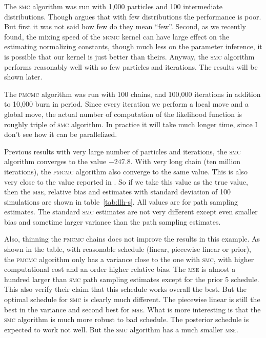 \documentclass[11pt, bib, fontset = Minion]{marticle}
\def\mcmc{\textsc{mcmc}\xspace}
\def\mse{\textsc{mse}\xspace}
\def\pmcmc{\textsc{pmcmc}\xspace}
\def\smc{\textsc{smc}\xspace}
\begin{document}
  The \smc algorithm was run with 1,000 particles and 100 intermediate
  distributions. Though \textcite{DelMoral:2006hc} argues that with few
  distributions the performance is poor. But first it was not said how few do
  they mean ``few''. Second, as we recently found, the mixing speed of the
  \mcmc kernel can have large effect on the estimating normalizing constants,
  though much less on the parameter inference, it is possible that our kernel
  is just better than theirs. Anyway, the \smc algorithm performs reasonably
  well with so few particles and iterations. The results will be shown later.

  The \pmcmc algorithm was run with 100 chains, and 100,000 iterations in
  addition to 10,000 burn in period. Since every iteration we perform a local
  move and a global move, the actual number of computation of the likelihood
  function is roughly triple of \smc algorithm. In practice it will take much
  longer time, since I don't see how it can be parallelized.

  Previous results with very large number of particles and iterations, the
  \smc algorithm converges to the value $-247.8$. With very long chain (ten
  million iterations), the \pmcmc algorithm also converge to the same value.
  This is also very close to the value reported in \textcite{DelMoral:2006hc}.
  So if we take this value as the true value, then the \mse, relative bias and
  estimates with standard deviation of 100 simulations are shown in
  table~\ref{tab:llh-s}. All values are for path sampling estimates. The
  standard \smc estimates are not very different except even smaller bias and
  sometime larger variance than the path sampling estimates.

  Also, thinning the \pmcmc chains does not improve the results in this
  example. As shown in the table, with reasonable schedule (linear, piecewise
  linear or prior), the \pmcmc algorithm only has a variance close to the one
  with \smc, with higher computational cost and an order higher relative bias.
  The \mse is almost a hundred larger than \smc path sampling estimates except
  for the prior 5 schedule. This also verify their claim that this schedule
  works overall the best. But the optimal schedule for \smc is clearly much
  different. The piecewise linear is still the best in the variance and second
  best for \mse. What is more interesting is that the \smc algorithm is much
  more robust to bad schedule. The posterior schedule is expected to work not
  well. But the \smc algorithm has a much smaller \mse.
\end{document}

